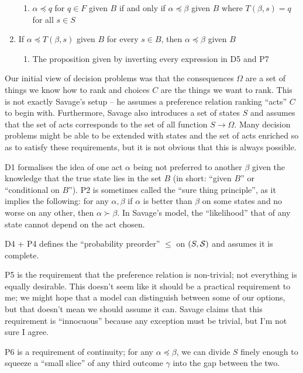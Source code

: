 \begin{enumerate}[P1:]
    \begin{enumerate}[D5:]
        \item $\alpha\preceq q$ for $q\in F$ given $B$ if and only if $\alpha\preceq \beta$ given $B$ where $T(\beta,s)=q$ for all $s\in S$
    \end{enumerate}
    \item If $\alpha\preceq T(\beta,s)$ given $B$ for every $s\in B$, then $\alpha\preceq \beta$ given $B$
    \begin{enumerate}[P7':]
        \item The proposition given by inverting every expression in D5 and P7
    \end{enumerate}
\end{enumerate}

Our initial view of decision problems was that the consequences $\Omega$ are a set of things we know how to rank and choices $C$ are the things we want to rank. This is not exactly Savage's setup -- he assumes a preference relation ranking ``acts'' $C$ to begin with. Furthermore, Savage also introduces a set of states $S$ and assumes that the set of acts corresponds to the set of all function $S\to \Omega$. Many decision problems might be able to be extended with states and the set of acts enriched so as to satisfy these requirements, but it is not obvious that this is always possible.

D1 formalises the idea of one act $\alpha$ being not preferred to another $\beta$ given the knowledge that the true state lies in the set $B$ (in short: ``given $B$'' or ``conditional on $B$''). P2 is sometimes called the ``sure thing principle'', as it implies the following: for any $\alpha, \beta$ if $\alpha$ is better than $\beta$ on some states and no worse on any other, then $\alpha\succ \beta$. In Savage's model, the ``likelihood'' that of any state cannot depend on the act chosen.

D4 + P4 defines the ``probability preorder'' $\leqslant$ on $(S,\mathcal{S})$ and assumes it is complete.

P5 is the requirement that the preference relation is non-trivial; not everything is equally desirable. This doesn't seem like it should be a practical requirement to me; we might hope that a model can distinguish between some of our options, but that doesn't mean we should assume it can. Savage claims that this requirement is ``innocuous'' because any exception must be trivial, but I'm not sure I agree.

P6 is a requirement of continuity; for any $\alpha\preceq \beta$, we can divide $S$ finely enough to squeeze a ``small slice'' of any third outcome $\gamma$ into the gap between the two.

